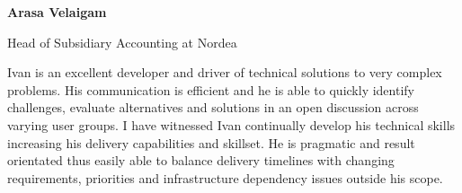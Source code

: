 \documentclass[letterpaper,11pt]{article}
\begin{document}
\textbf{Arasa Velaigam}

Head of Subsidiary Accounting at Nordea
\begin{displayquote}
Ivan is an excellent developer and driver of technical solutions to very complex problems. His communication is efficient and he is able to quickly identify challenges, evaluate alternatives and solutions in an open discussion across varying user groups.
I have witnessed Ivan continually develop his technical skills increasing his delivery capabilities and skillset.
He is pragmatic and result orientated thus easily able to balance delivery timelines with changing requirements, priorities and infrastructure dependency issues outside his scope.
\end{displayquote}

\end{document}
